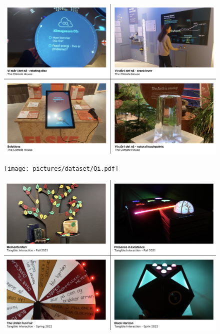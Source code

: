 \begin{figure}[H]
\includegraphics[width=13cm]{pictures/dataset/klimahuset.png}
\centering 
\end{figure}

\begin{figure}[H]
\texttt{[image: pictures/dataset/Qi.pdf]}
\centering 
\end{figure}

\begin{figure}[H]
\includegraphics[width=13cm]{pictures/dataset/tangible.png}
\centering 
\end{figure}

